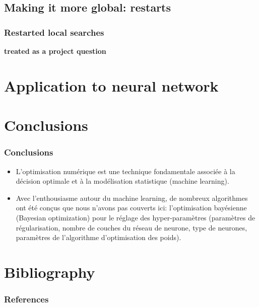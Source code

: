 \documentclass[12pt]{beamer}
\begin{document}
\subsection{Making it more global: restarts}

\begin{frame}
\frametitle{Restarted local searches} 
\vfill
\begin{center}
\begin{minipage}[c]{0.4\textwidth}
\textbf{treated as a project question}
\end{minipage}
\end{center}
\vfill
\end{frame}


\section{Application to neural network}

\section*{Conclusions}

\begin{frame}
\frametitle{Conclusions}
\begin{itemize}
\item L'optimisation numérique est une technique fondamentale associée à la décision optimale et à la modélisation statistique (machine learning).
\item Avec l'enthousiasme autour du machine learning, de nombreux algorithmes ont été conçus que nous n'avons pas couverts ici: l'optimisation bayésienne (Bayesian optimization) pour le réglage des hyper-paramètres (paramètres de régularisation, nombre de couches du réseau de neurone, type de neurones, paramètres de l'algorithme d'optimisation des poids).
\end{itemize}
\end{frame}

\section{Bibliography}

\begin{frame}[allowframebreaks]
\frametitle{References}
\scriptsize
%   
   
   
\end{frame}
\end{document}
